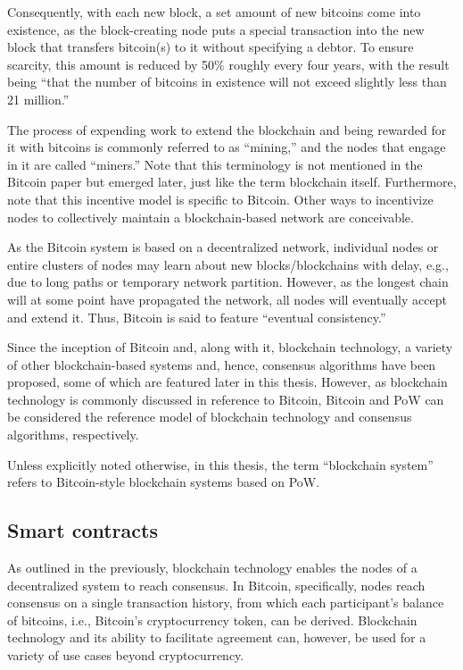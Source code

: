 Consequently, with each new block, a set amount of new bitcoins come into existence, as the block-creating node puts a special transaction into the new block that transfers bitcoin(s) to it without specifying a debtor.
To ensure scarcity, this amount is reduced by 50\% roughly every four years, with the result being ``that the number of bitcoins in existence will not exceed slightly less than 21 million.'' \autocite{bitcoinit2020b}

The process of expending work to extend the blockchain and being rewarded for it with bitcoins is commonly referred to as ``mining,'' and the nodes that engage in it are called ``miners.''
Note that this terminology is not mentioned in the Bitcoin paper but emerged later, just like the term blockchain itself.
Furthermore, note that this incentive model is specific to Bitcoin.
Other ways to incentivize nodes to collectively maintain a blockchain-based network are conceivable.

As the Bitcoin system is based on a decentralized network, individual nodes or entire clusters of nodes may learn about new blocks/blockchains with delay, e.g., due to long paths or temporary network partition.
However, as the longest chain will at some point have propagated the network, all nodes will eventually accept and extend it.
Thus, Bitcoin is said to feature ``eventual consistency.'' \autocite[35]{bashir2020}

Since the inception of Bitcoin and, along with it, blockchain technology, a variety of other blockchain-based systems and, hence, consensus algorithms have been proposed, some of which are featured later in this thesis.
However, as blockchain technology is commonly discussed in reference to Bitcoin, Bitcoin and PoW can be considered the reference model of blockchain technology and consensus algorithms, respectively.

Unless explicitly noted otherwise, in this thesis, the term ``blockchain system'' refers to Bitcoin-style blockchain systems based on PoW. 

\subsection{Smart contracts}

As outlined in the previously, blockchain technology enables the nodes of a decentralized system to reach consensus.
In Bitcoin, specifically, nodes reach consensus on a single transaction history, from which each participant's balance of bitcoins, i.e., Bitcoin's cryptocurrency token, can be derived.
Blockchain technology and its ability to facilitate agreement can, however, be used for a variety of use cases beyond cryptocurrency.


